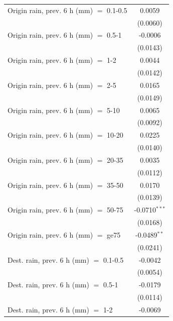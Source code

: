 \begin{tabular}{lc}
   Origin rain, prev. 6 h (mm) $=$ 0.1-0.5       & 0.0059\\   
                                                 & (0.0060)\\   
   Origin rain, prev. 6 h (mm) $=$ 0.5-1         & -0.0006\\   
                                                 & (0.0143)\\   
   Origin rain, prev. 6 h (mm) $=$ 1-2           & 0.0044\\   
                                                 & (0.0142)\\   
   Origin rain, prev. 6 h (mm) $=$ 2-5           & 0.0165\\   
                                                 & (0.0149)\\   
   Origin rain, prev. 6 h (mm) $=$ 5-10          & 0.0065\\   
                                                 & (0.0092)\\   
   Origin rain, prev. 6 h (mm) $=$ 10-20         & 0.0225\\   
                                                 & (0.0140)\\   
   Origin rain, prev. 6 h (mm) $=$ 20-35         & 0.0035\\   
                                                 & (0.0112)\\   
   Origin rain, prev. 6 h (mm) $=$ 35-50         & 0.0170\\   
                                                 & (0.0139)\\   
   Origin rain, prev. 6 h (mm) $=$ 50-75         & -0.0710$^{***}$\\   
                                                 & (0.0168)\\   
   Origin rain, prev. 6 h (mm) $=$ ge75          & -0.0489$^{**}$\\   
                                                 & (0.0241)\\   
   Dest. rain, prev. 6 h (mm) $=$ 0.1-0.5        & -0.0042\\   
                                                 & (0.0054)\\   
   Dest. rain, prev. 6 h (mm) $=$ 0.5-1          & -0.0179\\   
                                                 & (0.0114)\\   
   Dest. rain, prev. 6 h (mm) $=$ 1-2            & -0.0069\\   

\end{tabular}
